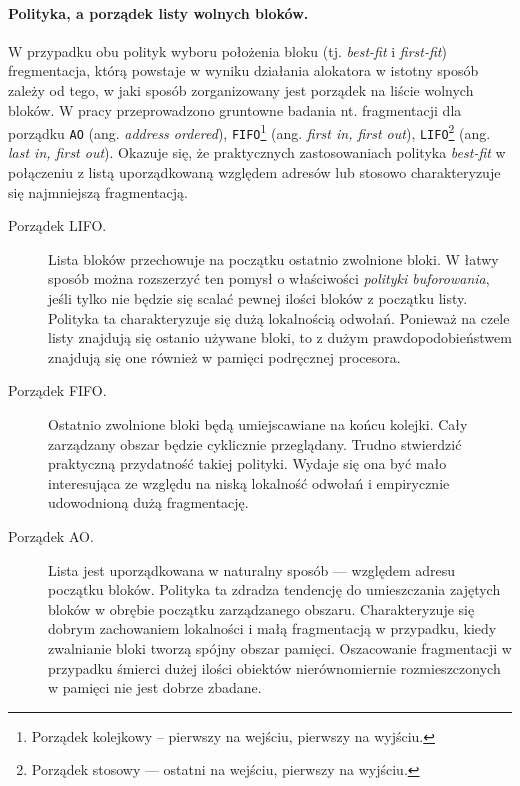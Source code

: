 \documentclass[12pt,a4paper,titlepage,twoside]{mwart}
\begin{document}
\paragraph{Polityka, a porządek listy wolnych bloków.}

W przypadku obu polityk wyboru położenia bloku (tj. \textit{best-fit} i
\textit{first-fit}) fregmentacja, którą powstaje w wyniku działania alokatora
w istotny sposób zależy od tego, w jaki sposób zorganizowany jest porządek na
liście wolnych bloków. W pracy \cite{johnstone98memory} przeprowadzono
gruntowne badania nt.  fragmentacji dla porządku \texttt{AO} (ang.
\textit{address ordered}), \texttt{FIFO}\footnote{Porządek kolejkowy --
pierwszy na wejściu, pierwszy na wyjściu.} (ang.  \textit{first in, first
out}), \texttt{LIFO}\footnote{Porządek stosowy --- ostatni na wejściu, pierwszy
na wyjściu.} (ang.  \textit{last in, first out}). Okazuje się, że praktycznych
zastosowaniach polityka \textit{best-fit} w połączeniu z listą uporządkowaną
względem adresów lub stosowo charakteryzuje się najmniejszą fragmentacją.
\vspace{-1ex}

\begin{description}

\item[Porządek LIFO.] Lista bloków przechowuje na początku ostatnio zwolnione
bloki. W łatwy sposób można rozszerzyć ten pomysł o właściwości
\textit{polityki buforowania}, jeśli tylko nie będzie się scalać pewnej ilości
bloków z początku listy. Polityka ta charakteryzuje się dużą lokalnością
odwołań. Ponieważ na czele listy znajdują się ostanio używane bloki, to z dużym
prawdopodobieństwem znajdują się one również w pamięci podręcznej procesora.

\vspace{1ex}

\item[Porządek FIFO.] Ostatnio zwolnione bloki będą umiejscawiane na końcu
kolejki. Cały zarządzany obszar będzie cyklicznie przeglądany. Trudno
stwierdzić praktyczną przydatność takiej polityki. Wydaje się ona być mało
interesująca ze względu na niską lokalność odwołań i empirycznie udowodnioną
dużą fragmentację.

\vspace{1ex}

\item[Porządek AO.] Lista jest uporządkowana w naturalny sposób --- względem
adresu początku bloków. Polityka ta zdradza tendencję do umieszczania zajętych
bloków w obrębie początku zarządzanego obszaru. Charakteryzuje się dobrym
zachowaniem lokalności i małą fragmentacją w przypadku, kiedy zwalnianie bloki
tworzą spójny obszar pamięci. Oszacowanie fragmentacji w przypadku śmierci
dużej ilości obiektów nierównomiernie rozmieszczonych w pamięci nie jest dobrze
zbadane.
\end{description}
\end{document}
